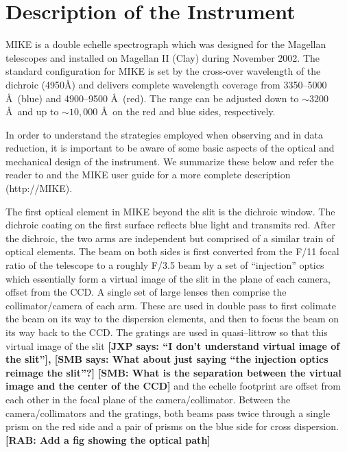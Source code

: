 \documentclass[12pt,preprint]{aastex}
\begin{document}
\section{Description of the Instrument} 
\label{sec:design}

MIKE is a double echelle spectrograph which was designed for the
Magellan telescopes and installed on Magellan II (Clay) 
during November 2002.
The standard configuration for MIKE is set by the cross-over
wavelength of the dichroic (4950\AA) and delivers complete wavelength
coverage from 3350--5000 \AA\ (blue) and 4900--9500 \AA\ (red).  The
range can be adjusted down to $\sim3200$ \AA\ and up to $\sim10,000$
\AA\ on the red and blue sides, respectively.

In order to understand the strategies employed when observing and
in data reduction,
it is important to be aware of some basic aspects of the optical and
mechanical design of the instrument.  We summarize  these below and
refer the reader to \cite{mike} and the MIKE user guide for
a more complete description (http://MIKE).

The first optical element in MIKE beyond the slit is the dichroic
window.  The dichroic coating on the first surface reflects blue light
and transmits red.  After the dichroic, the two arms are independent
but comprised of a similar train of optical elements.  The beam on
both sides is first converted from the F/11 focal ratio of the
telescope to a roughly F/3.5 beam by a set of ``injection'' optics
which essentially form a virtual image of the slit in the plane of each
camera, offset from the CCD.  A single set of large lenses then
comprise the collimator/camera of each arm.  These are used in double
pass to first colimate the beam on its way to the dispersion elements,
and then to focus the beam on its way back to the CCD.  The gratings are used
in quasi--littrow so that this virtual image of the slit 
{\bf [JXP says: ``I don't understand virtual image of the slit''], 
[SMB says: What about just saying ``the injection optics reimage the slit''?]} 
{\bf [SMB: What is the separation between the virtual image and the center
of the CCD]}
and the echelle footprint are offset from each other in the focal plane of the
camera/collimator. Between the camera/collimators and the gratings,
both beams pass twice through a single prism on the red side and a
pair of prisms on the blue side for cross dispersion.
{\bf [RAB: Add a fig showing the optical path]}


\end{document}
